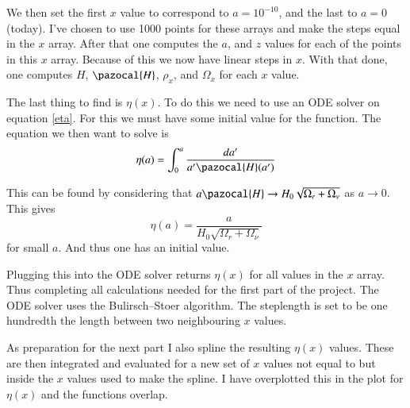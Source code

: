 \documentclass{aa}   %
\begin{document}
We then set the first $x$ value to correspond to $a= 10^{-10}$, and the last to $a=0$ (today). 
I've chosen to use 1000 points for these arrays and make the steps equal in the $x$ array. After that one computes the $a$, and $z$ values for each of the points in this $x$ array. Because of this we now have linear steps in $x$.
With that done, one computes $H$, $\pazocal{H}$, $\rho_x$, and $\Omega_x$ for each $x$ value.

The last thing to find is $\eta(x)$. 
To do this we need to use an ODE solver on equation \ref{eta}. For this we must have some initial value for the function. 
The equation we then want to solve is 
\begin{equation}
 \eta(a) = \int_0^a \frac{da'}{a'\pazocal{H}(a')}
\end{equation}

This can be found by considering that $a\pazocal{H} \rightarrow  H_0\sqrt{\Omega_r+\Omega_\nu}$ as $a \rightarrow 0$. This gives 
\begin{equation}
 \eta(a) = \frac{a}{H_0\sqrt{\Omega_r+\Omega_\nu}}
\end{equation}
for small $a$. And thus one has an initial value.

Plugging this into the ODE solver returns $\eta(x)$ for all values in the $x$ array. Thus completing all calculations needed for the first part of the project. The ODE solver uses the Bulirsch–Stoer algorithm. The steplength is set to be one hundredth the length between two neighbouring $x$ values.

As preparation for the next part I also spline the resulting $\eta(x)$ values. These are then integrated and evaluated for a new set of $x$ values not equal to but inside the $x$ values used to make the spline. I have overplotted this in the plot for $\eta(x)$ and the functions overlap. 

\end{document}
